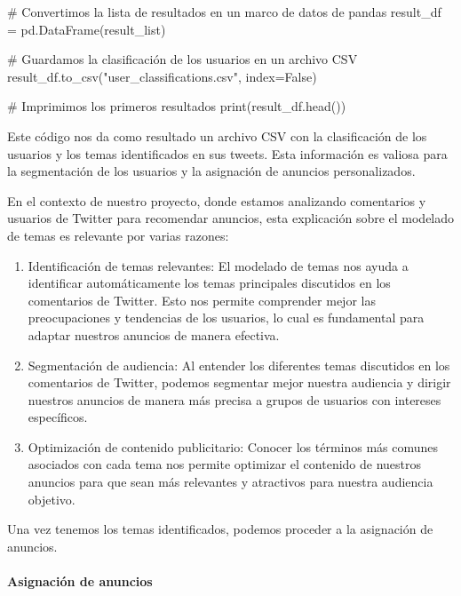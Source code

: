 \documentclass[
  letterpaper,
  DIV=11,
  numbers=noendperiod]{scrartcl}
\let\oldparagraph\paragraph
\renewcommand{\paragraph}[1]{\oldparagraph{#1}\mbox{}}
\newenvironment{Shaded}{\begin{snugshade}}{\end{snugshade}}
\newcommand{\BuiltInTok}[1]{\textcolor[rgb]{0.00,0.23,0.31}{#1}}
\newcommand{\CommentTok}[1]{\textcolor[rgb]{0.37,0.37,0.37}{#1}}
\newcommand{\NormalTok}[1]{\textcolor[rgb]{0.00,0.23,0.31}{#1}}
\newcommand{\OperatorTok}[1]{\textcolor[rgb]{0.37,0.37,0.37}{#1}}
\newcommand{\StringTok}[1]{\textcolor[rgb]{0.13,0.47,0.30}{#1}}
\newcommand{\VariableTok}[1]{\textcolor[rgb]{0.07,0.07,0.07}{#1}}
\begin{document}
\begin{Shaded}
\begin{Highlighting}[]
\CommentTok{\# Convertimos la lista de resultados en un marco de datos de pandas}
\NormalTok{result\_df }\OperatorTok{=}\NormalTok{ pd.DataFrame(result\_list)}

\CommentTok{\# Guardamos la clasificación de los usuarios en un archivo CSV}
\NormalTok{result\_df.to\_csv(}\StringTok{"user\_classifications.csv"}\NormalTok{, index}\OperatorTok{=}\VariableTok{False}\NormalTok{)}

\CommentTok{\# Imprimimos los primeros resultados}
\BuiltInTok{print}\NormalTok{(result\_df.head())}
\end{Highlighting}
\end{Shaded}

Este código nos da como resultado un archivo CSV con la clasificación de
los usuarios y los temas identificados en sus tweets. Esta información
es valiosa para la segmentación de los usuarios y la asignación de
anuncios personalizados.

En el contexto de nuestro proyecto, donde estamos analizando comentarios
y usuarios de Twitter para recomendar anuncios, esta explicación sobre
el modelado de temas es relevante por varias razones:

\begin{enumerate}
\def\labelenumi{\arabic{enumi}.}
\item
  Identificación de temas relevantes: El modelado de temas nos ayuda a
  identificar automáticamente los temas principales discutidos en los
  comentarios de Twitter. Esto nos permite comprender mejor las
  preocupaciones y tendencias de los usuarios, lo cual es fundamental
  para adaptar nuestros anuncios de manera efectiva.
\item
  Segmentación de audiencia: Al entender los diferentes temas discutidos
  en los comentarios de Twitter, podemos segmentar mejor nuestra
  audiencia y dirigir nuestros anuncios de manera más precisa a grupos
  de usuarios con intereses específicos.
\item
  Optimización de contenido publicitario: Conocer los términos más
  comunes asociados con cada tema nos permite optimizar el contenido de
  nuestros anuncios para que sean más relevantes y atractivos para
  nuestra audiencia objetivo.
\end{enumerate}

Una vez tenemos los temas identificados, podemos proceder a la
asignación de anuncios.

\paragraph{Asignación de anuncios}\label{asignaciuxf3n-de-anuncios}
\end{document}
